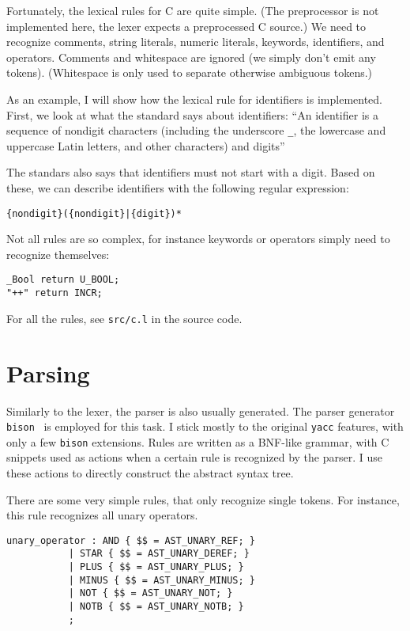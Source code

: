 \documentclass[12pt]{article}
\begin{document}
Fortunately, the lexical rules for C are quite simple. (The preprocessor is not
implemented here, the lexer expects a preprocessed C source.)  We need to
recognize comments, string literals, numeric literals, keywords, identifiers,
and operators. Comments and whitespace are ignored (we simply don't emit any
tokens). (Whitespace is only used to separate otherwise ambiguous tokens.)

As an example, I will show how the lexical rule for identifiers is implemented.
First, we look at what the standard says about identifiers:
``An identifier is a sequence of nondigit characters (including the underscore
\texttt{\_}, the lowercase and uppercase Latin letters, and other characters)
and digits''

The standars also says that identifiers must not start with a digit. Based on
these, we can describe identifiers with the following regular expression:
\begin{center}
\begin{BVerbatim}
{nondigit}({nondigit}|{digit})*
\end{BVerbatim}
\end{center}

Not all rules are so complex, for instance keywords or operators simply need to
recognize themselves:
\begin{center}
\begin{BVerbatim}
_Bool return U_BOOL;
"++" return INCR;
\end{BVerbatim}
\end{center}

For all the rules, see \texttt{src/c.l} in the source code.

\section{Parsing}
Similarly to the lexer, the parser is also usually generated. The parser
generator \texttt{bison}~\cite{bison} is employed for this task. I stick mostly
to the original \texttt{yacc} features, with only a few \texttt{bison}
extensions. Rules are written as a BNF-like grammar, with C snippets used as
actions when a certain rule is recognized by the parser. I use these actions to
directly construct the abstract syntax tree.

There are some very simple rules, that only recognize single tokens. For
instance, this rule recognizes all unary operators.
\begin{center}
\begin{BVerbatim}
unary_operator : AND { $$ = AST_UNARY_REF; }
	       | STAR { $$ = AST_UNARY_DEREF; }
	       | PLUS { $$ = AST_UNARY_PLUS; }
	       | MINUS { $$ = AST_UNARY_MINUS; }
	       | NOT { $$ = AST_UNARY_NOT; }
	       | NOTB { $$ = AST_UNARY_NOTB; }
	       ;
\end{BVerbatim}
\end{center}
\end{document}
